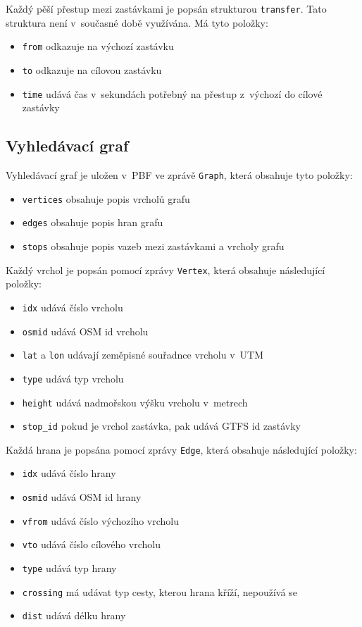 Každý pěší přestup mezi zastávkami je popsán strukturou {\tt transfer}. Tato
struktura není v~současné době využívána. Má tyto položky:
\begin{itemize}
	\item {\tt from} odkazuje na výchozí zastávku
	\item {\tt to} odkazuje na cílovou zastávku
	\item {\tt time} udává čas v~sekundách potřebný na přestup z~výchozí do
	cílové zastávky
\end{itemize}

\subsection{Vyhledávací graf}
Vyhledávací graf je uložen v~PBF ve zprávě {\tt Graph}, která obsahuje tyto
položky:
\begin{itemize}
	\item {\tt vertices} obsahuje popis vrcholů grafu
	\item {\tt edges} obsahuje popis hran grafu
	\item {\tt stops} obsahuje popis vazeb mezi zastávkami a vrcholy grafu 
\end{itemize} 
Každý vrchol je popsán pomocí zprávy {\tt Vertex}, která obsahuje následující
položky:
\begin{itemize}
	\item {\tt idx} udává číslo vrcholu
	\item {\tt osmid} udává OSM id vrcholu
	\item {\tt lat} a {\tt lon} udávají zeměpisné souřadnce vrcholu v~UTM
	\item {\tt type} udává typ vrcholu
	\item {\tt height} udává nadmořskou výšku vrcholu v~metrech
	\item {\tt stop\_id} pokud je vrchol zastávka, pak udává GTFS id
	zastávky 
\end{itemize} 
Každá hrana je popsána pomocí zprávy {\tt Edge}, která obsahuje následující
položky: 
\begin{itemize}
	\item {\tt idx} udává číslo hrany
	\item {\tt osmid} udává OSM id hrany
	\item {\tt vfrom} udává číslo výchozího vrcholu 
	\item {\tt vto} udává číslo cílového vrcholu
	\item {\tt type} udává typ hrany
	\item {\tt crossing} má udávat typ cesty, kterou hrana kříží, nepoužívá
	se
	\item {\tt dist} udává délku hrany
\end{itemize} 
